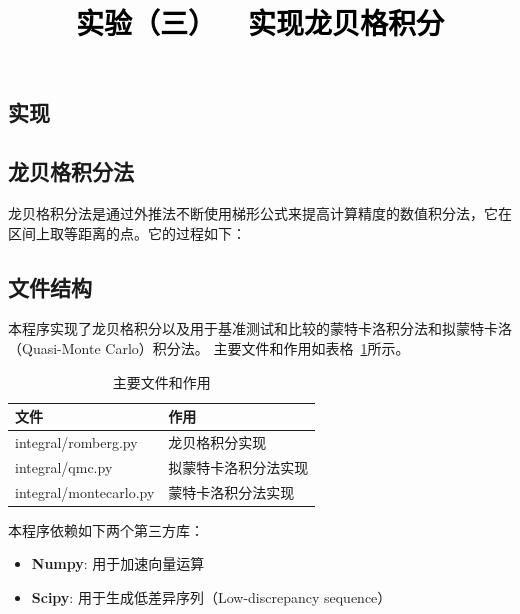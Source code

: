 \documentclass[a4paper,twoside]{article}
\newcommand{\PaperTitle}{实验（三）\ \ 实现龙贝格积分}  %
\begin{document}
\newpage

\title{
	\Large{\textcolor{black}{\PaperTitle}}
}
	
	
\maketitle
	
\tableofcontents
 
\newpage
\setcounter{page}{1}

\begin{spacing}{1.2}

\section{实现}

\subsection{龙贝格积分法}

龙贝格积分法是通过外推法不断使用梯形公式来提高计算精度的数值积分法，它在区间上取等距离的点。它的过程如下：


\subsection{文件结构}

本程序实现了龙贝格积分以及用于基准测试和比较的蒙特卡洛积分法和拟蒙特卡洛（Quasi-Monte Carlo）积分法。
主要文件和作用如表格~\ref{tbl:struct}所示。

\begin{table}[htbp]
	\centering
	\renewcommand\arraystretch{1.5}
	\begin{tabular}{p{4cm}p{6cm}}
		\toprule
		文件 & 作用 \\
		\midrule
		integral/romberg.py & 龙贝格积分实现 \\
		\hline
		integral/qmc.py & 拟蒙特卡洛积分法实现 \\
		\hline
		integral/montecarlo.py & 蒙特卡洛积分法实现 \\
		\bottomrule
	\end{tabular}
	\label{tbl:struct}
	\caption{主要文件和作用}
\end{table}

本程序依赖如下两个第三方库：
\begin{itemize}
	\item \textbf{Numpy}: 用于加速向量运算
	\item \textbf{Scipy}: 用于生成低差异序列（Low-discrepancy sequence）
\end{itemize}


\end{spacing}
\end{document}
